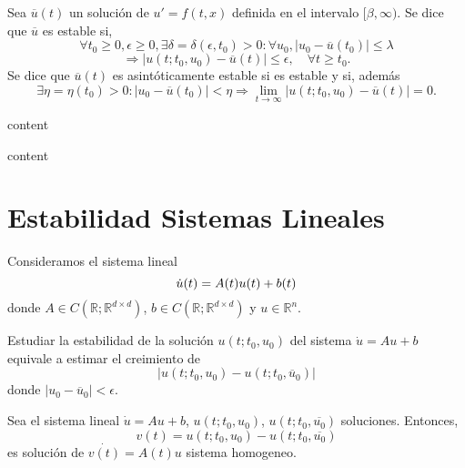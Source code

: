 \begin{defn}[Estabilidad]
  Sea $\overline{u}(t)$ un solución de $u' = f(t, x)$ definida en el intervalo $[\beta, \infty )$. Se dice que $\overline{u}$ es estable si, 
  \[ 
    \forall t_{0} \geq 0, \epsilon \geq 0, \exists \delta = \delta(\epsilon, t_{0}) > 0 : \forall u_{0}, | u_{0} - \overline{u}(t_{0}) | \leq \lambda 
  \] 
  \[ 
    \Rightarrow | u(t; t_{0}, u_{0}) - \overline{u}(t)| \leq \epsilon, \quad \forall t \geq t_{0}. 
  \] 
  Se dice que $\overline{u}(t)$ es asintóticamente estable si es estable y si, además 
  \[ 
    \exists \eta = \eta(t_{0}) > 0 : | u_{0} - \overline{u}(t_{0}) | < \eta \Rightarrow \lim_{t \to \infty} | u(t; t_{0}, u_{0}) - \overline{u}(t) | = 0.
  \] 
\end{defn}

\begin{defn}
  content
\end{defn}

\begin{defn}
   content
 \end{defn}

\section{Estabilidad Sistemas Lineales}

\begin{note}
  Consideramos el sistema lineal
  \[ 
    \dot{u}(t) = A(t) u(t) + b(t) \\
  \] 
  donde $A \in C(\mathbb{R}; \mathbb{R}^{d \times d})$, $b \in C(\mathbb{R}; \mathbb{R}^{d \times d})$ y $u \in \mathbb{R}^{n}$. \\
\end{note}

\begin{note}
  Estudiar la estabilidad de la solución $u(t; t_0, u_0)$ del sistema $\dot{u} = Au + b$ equivale a estimar el creimiento de
  \[ 
    | u(t; t_0, u_0) - u(t; t_0, \overline{u}_{0}) |
  \] 
  donde $ | u_{0} - \overline{u}_{0} | < \epsilon$.
\end{note}

\begin{note}
  Sea el sistema lineal $\dot{u} = Au + b$, $u(t; t_0, u_0)$, $u(t; t_0, \overline{u_{0}})$ soluciones. Entonces,
  \[ 
    v(t) = u(t; t_0, u_0) - u(t; t_0, \overline{u_{0}})
  \] 
  es solución de $\dot{v(t)} = A(t) u $ sistema homogeneo.
\end{note}

